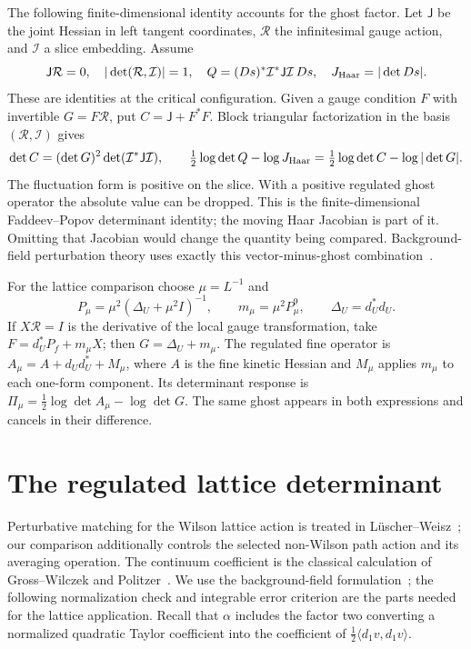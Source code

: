 The following finite-dimensional identity accounts for the ghost
factor. Let $\mathsf J$ be the joint Hessian in left tangent coordinates,
$\mathcal R$ the infinitesimal gauge action, and $\mathcal I$ a
slice embedding. Assume
\[
 \mathsf J\mathcal R=0,\quad |\det(\mathcal R,\mathcal I)|=1,
 \quad Q=(Ds)^*\mathcal I^*\mathsf J\mathcal I\,Ds,
 \quad J_{\rm Haar}=|\det Ds|.
\]
These are identities at the critical configuration. Given a gauge
condition $F$ with invertible $G=F\mathcal R$, put
$C=\mathsf J+F^*F$. Block triangular factorization in the basis
$(\mathcal R,\mathcal I)$ gives
\[
 \det C=(\det G)^2\det(\mathcal I^*\mathsf J\mathcal I),
 \qquad
 \tfrac12\log\det Q-\log J_{\rm Haar}
 =\tfrac12\log\det C-\log|\det G|.
\]
The fluctuation form is positive on the slice. With a positive regulated
ghost operator the absolute value can be dropped. This is the
finite-dimensional Faddeev--Popov determinant identity; the moving
Haar Jacobian is part of it. Omitting that Jacobian would change the
quantity being compared. Background-field perturbation theory uses
exactly this vector-minus-ghost combination~\cite{Abbott1982}.

For the lattice comparison choose $\mu=L^{-1}$ and
\[
 P_\mu=\mu^2(\Delta_U+\mu^2I)^{-1},\qquad
 m_\mu=\mu^2P_\mu^9,\qquad \Delta_U=d_U^*d_U.
\]
If $X\mathcal R=I$ is the derivative of the local gauge transformation, take
$F=d_U^*P_f+m_\mu X$; then $G=\Delta_U+m_\mu$.
The regulated fine operator is
$A_\mu=A+d_Ud_U^*+M_\mu$, where $A$ is the fine kinetic Hessian
and $M_\mu$ applies $m_\mu$ to each one-form component.
Its determinant response is
$\Pi_\mu=\frac12\log\det A_\mu-\log\det G$.
The same ghost appears in both expressions and cancels in their
difference.

\section{The regulated lattice determinant}\label{ch07:one-loop}

Perturbative matching for the Wilson lattice action is treated in
L\"uscher--Weisz~\cite{LuscherWeisz1995}; our comparison additionally
controls the selected non-Wilson path action and its averaging operation.
The continuum coefficient is the classical calculation of
Gross--Wilczek and Politzer~\cite{GrossWilczek1973,Politzer1973}.
We use the background-field formulation~\cite{Abbott1982}; the following
normalization check and integrable error criterion are the parts needed
for the lattice application. Recall that $\alpha$ includes the factor
two converting a normalized quadratic Taylor coefficient into the
coefficient of $\frac12\langle d_1v,d_1v\rangle$.

